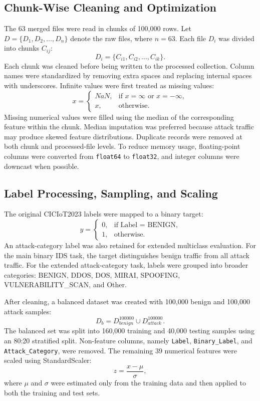\documentclass[journal]{IEEEtran}
\begin{document}
\subsection{Chunk-Wise Cleaning and Optimization}
The 63 merged files were read in chunks of 100,000 rows. Let $D=\{D_1,D_2,\ldots,D_n\}$ denote the raw files, where $n=63$. Each file $D_i$ was divided into chunks $C_{ij}$:
\begin{equation}
D_i=\{C_{i1},C_{i2},\ldots,C_{ik}\}.
\end{equation}
Each chunk was cleaned before being written to the processed collection. Column names were standardized by removing extra spaces and replacing internal spaces with underscores. Infinite values were first treated as missing values:
\begin{equation}
x=\begin{cases}
NaN, & \text{if }x=\infty\text{ or }x=-\infty,\\
x, & \text{otherwise}.
\end{cases}
\end{equation}
Missing numerical values were filled using the median of the corresponding feature within the chunk. Median imputation was preferred because attack traffic may produce skewed feature distributions. Duplicate records were removed at both chunk and processed-file levels. To reduce memory usage, floating-point columns were converted from \texttt{float64} to \texttt{float32}, and integer columns were downcast when possible.

\subsection{Label Processing, Sampling, and Scaling}
The original CICIoT2023 labels were mapped to a binary target:
\begin{equation}
y=\begin{cases}
0, & \text{if Label = BENIGN},\\
1, & \text{otherwise}.
\end{cases}
\end{equation}
An attack-category label was also retained for extended multiclass evaluation. For the main binary IDS task, the target distinguishes benign traffic from all attack traffic. For the extended attack-category task, labels were grouped into broader categories: BENIGN, DDOS, DOS, MIRAI, SPOOFING, VULNERABILITY\_SCAN, and Other.

After cleaning, a balanced dataset was created with 100,000 benign and 100,000 attack samples:
\begin{equation}
D_b=D_{benign}^{100000}\cup D_{attack}^{100000}.
\end{equation}
The balanced set was split into 160,000 training and 40,000 testing samples using an 80:20 stratified split. Non-feature columns, namely \texttt{Label}, \texttt{Binary\_Label}, and \texttt{Attack\_Category}, were removed. The remaining 39 numerical features were scaled using StandardScaler:
\begin{equation}
z=\frac{x-\mu}{\sigma},
\end{equation}
where $\mu$ and $\sigma$ were estimated only from the training data and then applied to both the training and test sets.
\end{document}
